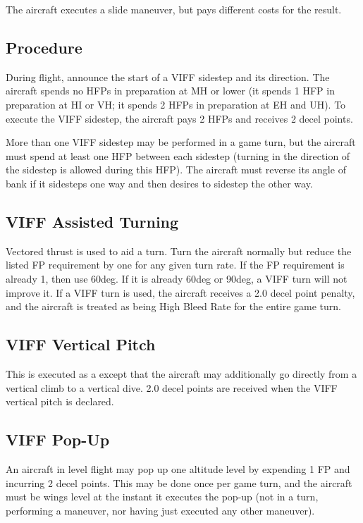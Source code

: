 \begin{advancedrules}
    The aircraft executes a slide maneuver, but pays different costs for the result.

    \subsection{Procedure} During flight, announce the start of a VIFF sidestep and its direction. The aircraft spends no HFPs in preparation at MH or lower (it spends 1 HFP in preparation at HI or VH; it spends 2 HFPs in preparation at EH and UH). To execute the VIFF sidestep, the aircraft pays 2 HFPs and receives 2 decel points.

    More than one VIFF sidestep may be performed in a game turn, but the aircraft must spend at least one HFP between each sidestep (turning in the direction of the sidestep is allowed during this HFP). The aircraft must reverse its angle of bank if it sidesteps one way and then desires to sidestep the other way.

    \subsection{VIFF Assisted Turning}

    Vectored thrust is used to aid a turn. Turn the aircraft normally but reduce the listed FP requirement by one for any given turn rate. If the FP requirement is already 1, then use 60{deg}. If it is already 60{deg} or 90{deg}, a VIFF turn will not improve it. If a VIFF turn is used, the aircraft receives a 2.0 decel point penalty, and the aircraft is treated as being High Bleed Rate for the entire game turn.

    \subsection{VIFF Vertical Pitch}

    This is executed as a  except that the aircraft may additionally go directly from a vertical climb to a vertical dive. 2.0 decel points are received when the VIFF vertical pitch is declared. 

    \subsection{VIFF Pop-Up}

    An aircraft in level flight may pop up one altitude level by expending 1 FP and incurring 2 decel points. This may be done once per game turn, and the aircraft must be wings level at the instant it executes the pop-up (not in a turn, performing a maneuver, nor having just executed any other maneuver).


\end{advancedrules}
